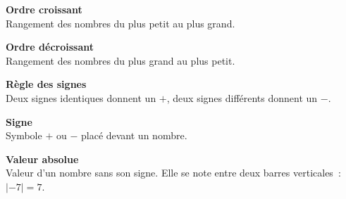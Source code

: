 \begin{tcbraster}[raster columns=2, raster equal height, raster valign=top,raster column skip=2mm, raster row skip=2mm]
\begin{terme}
\textbf{\large Ordre croissant}\\[2pt]
{\small Rangement des nombres du plus petit au plus grand.}
\end{terme}
\begin{terme}
\textbf{\large Ordre décroissant}\\[2pt]
{\small Rangement des nombres du plus grand au plus petit.}
\end{terme}
\begin{terme}
\textbf{\large Règle des signes}\\[2pt]
{\small Deux signes identiques donnent un $+$, deux signes différents donnent un $-$.}
\end{terme}
\begin{terme}
\textbf{\large Signe}\\[2pt]
{\small Symbole $+$ ou $-$ placé devant un nombre.}
\end{terme}
\begin{terme}
\textbf{\large Valeur absolue}\\[2pt]
{\small Valeur d'un nombre sans son signe. Elle se note entre deux barres verticales~: $\lvert -7\rvert=7$.}
\end{terme}
\end{tcbraster}